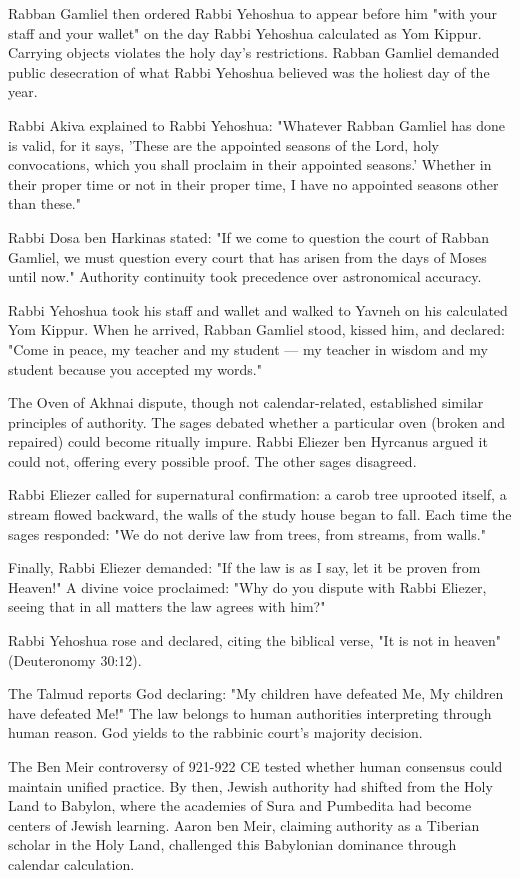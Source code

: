 Rabban Gamliel then ordered Rabbi Yehoshua to appear before him "with your staff and your wallet" on the day Rabbi Yehoshua calculated as Yom Kippur. Carrying objects violates the holy day's restrictions. Rabban Gamliel demanded public desecration of what Rabbi Yehoshua believed was the holiest day of the year.

Rabbi Akiva explained to Rabbi Yehoshua: "Whatever Rabban Gamliel has done is valid, for it says, 'These are the appointed seasons of the Lord, holy convocations, which you shall proclaim in their appointed seasons.' Whether in their proper time or not in their proper time, I have no appointed seasons other than these."

Rabbi Dosa ben Harkinas stated: "If we come to question the court of Rabban Gamliel, we must question every court that has arisen from the days of Moses until now." Authority continuity took precedence over astronomical accuracy.

Rabbi Yehoshua took his staff and wallet and walked to Yavneh on his calculated Yom Kippur. When he arrived, Rabban Gamliel stood, kissed him, and declared: "Come in peace, my teacher and my student — my teacher in wisdom and my student because you accepted my words."

The Oven of Akhnai dispute, though not calendar-related, established similar principles of authority. The sages debated whether a particular oven (broken and repaired) could become ritually impure. Rabbi Eliezer ben Hyrcanus argued it could not, offering every possible proof. The other sages disagreed.

Rabbi Eliezer called for supernatural confirmation: a carob tree uprooted itself, a stream flowed backward, the walls of the study house began to fall. Each time the sages responded: "We do not derive law from trees, from streams, from walls."

Finally, Rabbi Eliezer demanded: "If the law is as I say, let it be proven from Heaven!" A divine voice proclaimed: "Why do you dispute with Rabbi Eliezer, seeing that in all matters the law agrees with him?"

Rabbi Yehoshua rose and declared, citing the biblical verse, "It is not in heaven" (Deuteronomy 30:12).

The Talmud reports God declaring: "My children have defeated Me, My children have defeated Me!" The law belongs to human authorities interpreting through human reason. God yields to the rabbinic court's majority decision.

The Ben Meir controversy of 921-922 CE tested whether human consensus could maintain unified practice. By then, Jewish authority had shifted from the Holy Land to Babylon, where the academies of Sura and Pumbedita had become centers of Jewish learning. Aaron ben Meir, claiming authority as a Tiberian scholar in the Holy Land, challenged this Babylonian dominance through calendar calculation.

